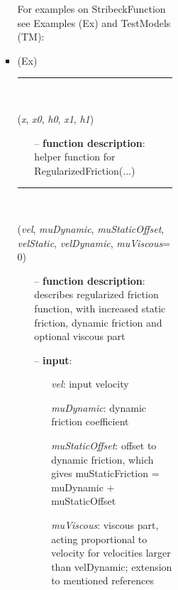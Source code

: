 \begin{itemize}[leftmargin=1.4cm]
\begin{itemize}[leftmargin=0.5cm]
\begin{itemize}[leftmargin=1.4cm]
\begin{itemize}[leftmargin=0.5cm]
\begin{itemize}[leftmargin=1.4cm]
\begin{itemize}[leftmargin=0.5cm]
\begin{itemize}[leftmargin=1.4cm]
\begin{itemize}[leftmargin=1.4cm]
\begin{itemize}[leftmargin=1.4cm]
\begin{itemize}[leftmargin=1.4cm]
\begin{itemize}[leftmargin=0.5cm]
\begin{itemize}[leftmargin=1.4cm]
%
%
\noindent For examples on StribeckFunction see Examples (Ex) and TestModels (TM):
\bi
 \item \footnotesize {} (Ex)\ei

%
\noindent\rule{8cm}{0.75pt}\vspace{1pt} \\ 
\begin{flushleft}
\label{sec:physics:RegularizedFrictionStep}
({\it x}, {\it x0}, {\it h0}, {\it x1}, {\it h1})
\end{flushleft}
\setlength{\itemindent}{0.7cm}
\begin{itemize}[leftmargin=0.7cm]
  \item[--]  {\bf function description}: helper function for RegularizedFriction(...)\vspace{12pt}\end{itemize}
%
\noindent\rule{8cm}{0.75pt}\vspace{1pt} \\ 
\begin{flushleft}
\label{sec:physics:RegularizedFriction}
({\it vel}, {\it muDynamic}, {\it muStaticOffset}, {\it velStatic}, {\it velDynamic}, {\it muViscous}= 0)
\end{flushleft}
\setlength{\itemindent}{0.7cm}
\begin{itemize}[leftmargin=0.7cm]
  \item[--]  {\bf function description}: describes regularized friction function, with increased static friction, dynamic friction and optional viscous part  \item[--]  {\bf input}: \vspace{-6pt}
  \begin{itemize}[leftmargin=1.2cm]
\setlength{\itemindent}{-0.7cm}
    \item[] {\it vel}: input velocity
    \item[] {\it   muDynamic}: dynamic friction coefficient
    \item[] {\it   muStaticOffset}: offset to dynamic friction, which gives muStaticFriction = muDynamic + muStaticOffset
    \item[] {\it   muViscous}: viscous part, acting proportional to velocity for velocities larger than velDynamic; extension to mentioned references

\end{itemize}
\end{itemize}
\end{itemize}
\end{itemize}
\end{itemize}
\end{itemize}
\end{itemize}
\end{itemize}
\end{itemize}
\end{itemize}
\end{itemize}
\end{itemize}
\end{itemize}
\end{itemize}
